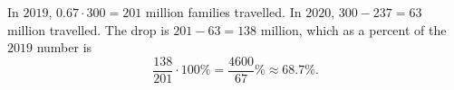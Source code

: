In $2019$, $0.67\cdot300=201$ million families travelled. In $2020$, $300-237=63$ million travelled. The drop is $201-63=138$ million, which as a percent of the $2019$ number is
\[\dfrac{138}{201}\cdot100\%=\dfrac{4600}{67}\%\approx\boxed{68.7\%}.\]
